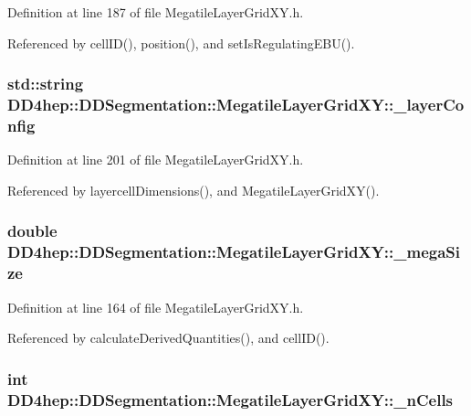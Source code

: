 Definition at line 187 of file MegatileLayerGridXY.h.

Referenced by cellID(), position(), and setIsRegulatingEBU().\hypertarget{class_d_d4hep_1_1_d_d_segmentation_1_1_megatile_layer_grid_x_y_a71605d3d5b86f140cfb6c2d7458e3cd8}{
\subsubsection[{\_\-layerConfig}]{\setlength{\rightskip}{0pt plus 5cm}std::string {\bf DD4hep::DDSegmentation::MegatileLayerGridXY::\_\-layerConfig}}}
\label{class_d_d4hep_1_1_d_d_segmentation_1_1_megatile_layer_grid_x_y_a71605d3d5b86f140cfb6c2d7458e3cd8}


Definition at line 201 of file MegatileLayerGridXY.h.

Referenced by layercellDimensions(), and MegatileLayerGridXY().\hypertarget{class_d_d4hep_1_1_d_d_segmentation_1_1_megatile_layer_grid_x_y_af1dd67aeaebfeb9a9c5fbd268df8dbc5}{
\subsubsection[{\_\-megaSize}]{\setlength{\rightskip}{0pt plus 5cm}double {\bf DD4hep::DDSegmentation::MegatileLayerGridXY::\_\-megaSize}}}
\label{class_d_d4hep_1_1_d_d_segmentation_1_1_megatile_layer_grid_x_y_af1dd67aeaebfeb9a9c5fbd268df8dbc5}


Definition at line 164 of file MegatileLayerGridXY.h.

Referenced by calculateDerivedQuantities(), and cellID().\hypertarget{class_d_d4hep_1_1_d_d_segmentation_1_1_megatile_layer_grid_x_y_a5bfd46085fb8a5db80e1333d47230505}{
\subsubsection[{\_\-nCells}]{\setlength{\rightskip}{0pt plus 5cm}int {\bf DD4hep::DDSegmentation::MegatileLayerGridXY::\_\-nCells}}}
\label{class_d_d4hep_1_1_d_d_segmentation_1_1_megatile_layer_grid_x_y_a5bfd46085fb8a5db80e1333d47230505}


